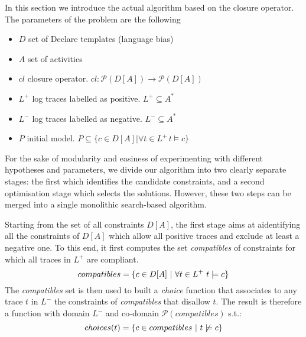 In this section we introduce the actual algorithm based on the closure operator. The parameters of the problem are the following
\begin{itemize}
  \item $D$ set of Declare templates (language bias)
  \item $A$ set of activities
  \item $cl$ closure operator. $cl: \mathcal{P}(D[A])\rightarrow\mathcal{P}(D[A])$
  \item $L^+$ log traces labelled as positive. $L^+ \subseteq A^*$
  \item $L^-$ log traces labelled as negative. $L^- \subseteq A^*$
  \item $P$ initial model. $P\subseteq \{c\in D[A]| \forall t\in L^+\, t\models c\}$
\end{itemize}

For the sake of modularity and easiness of experimenting with different hypotheses and parameters, we divide our algorithm into two clearly separate stages: the first which identifies the candidate constraints, and a second optimisation stage which selects the solutions. However, these two steps can be merged into a single monolithic search-based algorithm. %

Starting from the set of all constraints $D[A]$, the first stage aims at aidentifying all the constraints of $D[A]$ which allow all positive traces and exclude at least a negative one. To this end, it first computes the set \textit{compatibles} of constraints for which all traces in $L^+$ are compliant. 
\begin{equation}
{compatibles} = \{c\in D[A]~|~\forall t\in L^+~ t\models c \} \\
\end{equation}
%
The \textit{compatibles} set is then used to built a \textit{choice} function that associates to any trace $t$ in $L^-$ the constraints of \textit{compatibles} that disallow $t$.
The result is therefore a function with domain $L^-$ and co-domain $\mathcal{P}({compatibles})$ s.t.:
\begin{equation}
{choices}(t) = \{c\in {compatibles}~|~t\not\models c\} \\
\end{equation}

